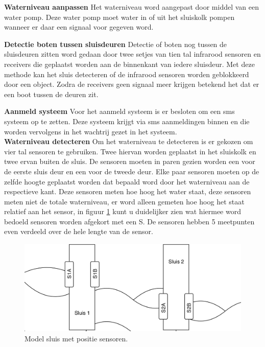 \documentclass{article}
\begin{document}
\noindent\textbf{Waterniveau aanpassen}\newline
Het waterniveau word aangepast door middel van een water pomp. Deze water pomp moet water in of uit het sluiskolk pompen wanneer er daar een signaal voor gegeven word.\newline

\noindent\textbf{Detectie boten tussen sluisdeuren}\newline
Detectie of boten nog tussen de sluisdeuren zitten word gedaan door twee setjes van tien tal infrarood sensoren en receivers die geplaatst worden aan de binnenkant van iedere sluisdeur. Met deze methode kan het sluis detecteren of de infrarood sensoren worden geblokkeerd door een object. Zodra de receivers geen signaal meer krijgen betekend het dat er een boot tussen de deuren zit.\newline

\noindent\textbf{Aanmeld systeem}\newline
Voor het aanmeld systeem is er besloten om een sms systeem op te zetten. Deze systeem krijgt via sms aanmeldingen binnen en die worden vervolgens in het wachtrij gezet in het systeem. \newline \\

\noindent\textbf{Waterniveau detecteren}\newline
\newline Om het waterniveau te detecteren is er gekozen om vier tal sensoren te gebruiken. Twee hiervan worden geplaatst in het sluiskolk en twee ervan buiten de sluis. De sensoren moeten in paren gezien worden een voor de eerste sluis deur en een voor de tweede deur. Elke paar sensoren moeten op de zelfde hoogte geplaatst worden dat bepaald word door het waterniveau aan de respectieve kant. Deze sensoren meten hoe hoog het water staat, deze sensoren meten niet de totale waterniveau, er word alleen gemeten hoe hoog het staat relatief aan het sensor, in figuur \ref{fig:sluiceSensoren} kunt u duidelijker zien wat hiermee word bedoeld sensoren worden afgekort met een S. De sensoren hebben 5 meetpunten even verdeeld over de hele lengte van de sensor.
\begin{figure}[!h]
	\centering
	\includegraphics[width=\textwidth]{images/sluis_sensoren.png}
    \caption{Model sluis met positie sensoren.}
	\label{fig:sluiceSensoren}
\end{figure} \newpage
\end{document}
